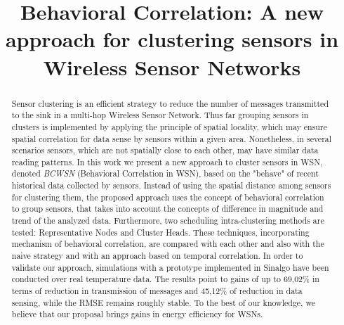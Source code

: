 \documentclass[conference]{IEEEtran}
\begin{document}
%

\title{Behavioral Correlation: A new approach for clustering sensors in Wireless Sensor Networks}

\author{
\and
{}
\and
{}
}


\maketitle


\begin{abstract}

Sensor clustering is an efficient strategy to reduce the number of messages
transmitted to the sink in a multi-hop Wireless Sensor Network. Thus far
grouping sensors in clusters is implemented by applying the principle of spatial
locality, which may ensure spatial correlation for data sense by sensors within
a given area. Nonetheless, in several scenarios sensors, which are not spatially
close to each other, may have similar data reading patterns.
In this work we present a new approach to cluster sensors in WSN, denoted {\it
BCWSN} (Behavioral Correlation in WSN), based on the "behave" of recent
historical data collected by sensors. Instead of using the spatial distance
among sensors for clustering them, the proposed approach uses the concept of
behavioral correlation to group sensors, that takes into account the concepts of
difference in magnitude and trend of the analyzed data.
Furthermore, two scheduling intra-clustering methods are tested: Representative
Nodes and Cluster Heads. These techniques, incorporating mechanism of behavioral
correlation, are compared with each other and also with the naive strategy and
with an approach based on temporal correlation.
In order to validate our approach, simulations with a prototype implemented in
Sinalgo have been conducted over real temperature data. The results point to
gains of up to 69,02\% in terms of reduction in transmission of messages and
45,12\% of reduction in data sensing, while the RMSE remains roughly stable. To
the best of our knowledge, we believe that our proposal brings gains in energy
efficiency for WSNs.


\end{abstract}
\end{document}
